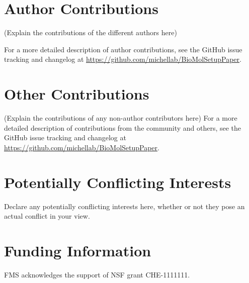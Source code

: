 \documentclass[9pt,bestpractices]{livecoms}
\newcommand{\githubrepository}{\url{https://github.com/michellab/BioMolSetupPaper}}  %
\begin{document}
\section{Author Contributions}
%

(Explain the contributions of the different authors here)

For a more detailed description of author contributions,
see the GitHub issue tracking and changelog at \githubrepository.

\section{Other Contributions}
%

(Explain the contributions of any non-author contributors here)
For a more detailed description of contributions from the community and others, see the GitHub issue tracking and changelog at \githubrepository.

\section{Potentially Conflicting Interests}

Declare any potentially conflicting interests here, whether or not they pose an actual conflict in your view.

\section{Funding Information}
FMS acknowledges the support of NSF grant CHE-1111111.




\end{document}

